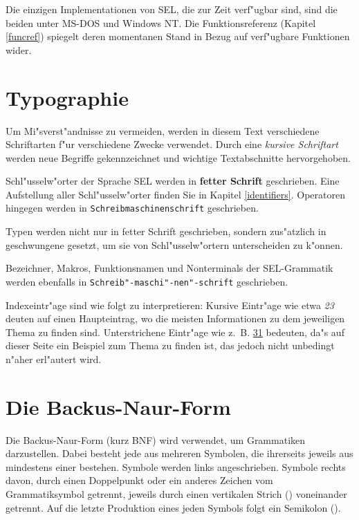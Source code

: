 Die einzigen Implementationen von SEL, die zur Zeit verf"ugbar
sind, sind die beiden  unter MS-DOS und Windows
NT. Die Funktionsreferenz (Kapitel \ref{funcref}) spiegelt deren
momentanen Stand in Bezug auf verf"ugbare Funktionen wider.

\section{Typographie}

Um Mi"sverst"andnisse zu vermeiden, werden in diesem Text
verschiedene Schriftarten f"ur verschiedene Zwecke verwendet.
Durch eine {\em kursive Schriftart} werden neue Begriffe
gekennzeichnet und wichtige Textabschnitte hervorgehoben.

Schl"usselw"orter der Sprache SEL werden in {\bf fetter Schrift}
geschrieben. Eine Aufstellung aller Schl"usselw"orter finden Sie
in Kapitel \ref{identifiers}. Operatoren hingegen werden in
{\tt Schreibmaschinenschrift} geschrieben.

Typen werden nicht nur in fetter Schrift geschrieben, sondern
zus"atzlich in geschwungene  gesetzt, um sie von
Schl"usselw"ortern unterscheiden zu k"onnen.

Bezeichner, Makros, Funktionsnamen und Nonterminals der
SEL-Grammatik werden ebenfalls in
{\tt Schreib"-maschi"-nen"-schrift} geschrieben.

Indexeintr"age
sind wie folgt zu interpretieren: Kursive
Eintr"age wie etwa {\em 23} deuten auf einen Haupteintrag, wo die
meisten Informationen zu dem jeweiligen Thema zu finden sind.
Unterstrichene Eintr"age wie z.~B. \underline{31} bedeuten, da"s
auf dieser Seite ein Beispiel zum Thema zu finden ist, das jedoch
nicht unbedingt n"aher erl"autert wird.

\section{Die Backus-Naur-Form}

Die Backus-Naur-Form (kurz BNF) wird verwendet, um Grammatiken
darzustellen. Dabei besteht jede  aus mehreren
Symbolen, die ihrerseits jeweils aus mindestens einer
 bestehen. Symbole werden links angeschrieben.
Symbole rechts davon, durch einen Doppelpunkt oder ein anderes
Zeichen vom Grammatiksymbol getrennt, jeweils durch einen
vertikalen Strich (\fu{|}) voneinander getrennt. Auf die letzte
Produktion eines jeden Symbols folgt ein Semikolon (\fu{;}).

